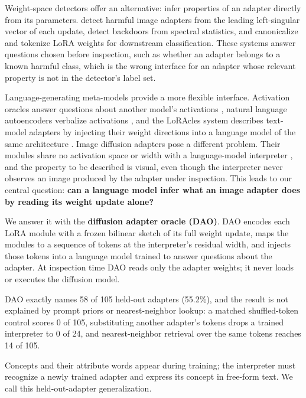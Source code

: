 \documentclass{article}
\begin{document}
Weight-space detectors offer an alternative: infer properties of an adapter directly from its
parameters. \citet{africa2026csam} detect harmful image adapters from the leading left-singular
vector of each update, \citet{puertolas2026backdoors} detect backdoors from spectral statistics, and
\citet{han2026w2t} canonicalize and tokenize LoRA weights for downstream classification. These
systems answer questions chosen before inspection, such as whether an adapter belongs to a known
harmful class, which is the wrong interface for an adapter whose relevant property is not in the
detector's label set.

Language-generating meta-models provide a more flexible interface. Activation oracles answer
questions about another model's activations \citep{karvonen2026activationoracles}, natural language
autoencoders verbalize activations \citep{frasertaliente2026nla}, and the LoRAcles system describes text-model
adapters by injecting their weight directions into a language model of the same architecture
\citep{selder2026loracle}. Image diffusion adapters pose a different problem. Their modules share no
activation space or width with a language-model interpreter \citep{peebles2023dit}, and the property
to be described is visual, even though the interpreter never observes an image produced by the
adapter under inspection. This leads to our central question: \textbf{can a language model infer
what an image adapter does by reading its weight update alone?}

We answer it with the \textbf{diffusion adapter oracle (DAO)}. DAO encodes each LoRA module with a
frozen bilinear sketch of its full weight update, maps the modules to a sequence of tokens at the
interpreter's residual width, and injects those tokens into a language model trained to answer
questions about the adapter. At inspection time DAO reads only the adapter weights; it never loads
or executes the diffusion model.

DAO exactly names 58 of 105 held-out adapters (55.2\%), and the result is not explained by prompt
priors or nearest-neighbor lookup: a matched shuffled-token control scores 0 of 105, substituting
another adapter's tokens drops a trained interpreter to 0 of 24, and nearest-neighbor retrieval over
the same tokens reaches 14 of 105.

Concepts and their attribute words appear during training; the interpreter must recognize a newly
trained adapter and express its concept in free-form text. We call this held-out-adapter
generalization.
\end{document}
